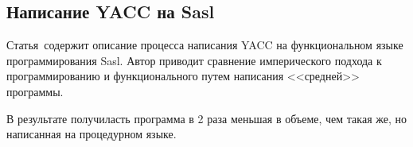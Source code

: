 \subsection{Написание YACC на Sasl} \label{subsection_Jones1985}
Статья\,\cite{Jones1985} содержит описание процесса написания YACC на функциональном языке программирования Sasl. Автор приводит сравнение имперического подхода к программированию и функционального путем написания <<средней>> программы. 

В результате получиласть программа в 2 раза меньшая в объеме, чем такая же, но написанная на процедурном языке.

